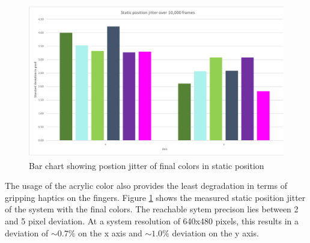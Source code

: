 \begin{figure}[H]
\centering
\includegraphics[width=\textwidth]{images/acrylic_color_jitter.jpg}
\caption{Bar chart showing postion jitter of final colors in static position}
\label{img:color_jitter}
\end{figure}
 The usage of the acrylic color also provides the least degradation in terms of gripping haptics on the fingers. Figure \ref{img:color_jitter} shows the measured static position jitter of the system with the final colors. The reachable sytem precison lies between 2 and 5 pixel deviation. At a system resolution of 640x480 pixels, this results in a deviation of $\sim 0.7\%$ on the x axis and $\sim 1.0\%$ deviation on the y axis.
